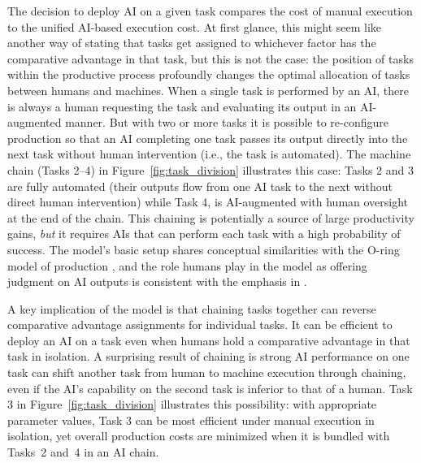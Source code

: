 \documentclass{article}
\theoremstyle{plain}
\theoremstyle{plain}
\begin{document}
The decision to deploy AI on a given task compares the cost of manual execution to the unified AI-based execution cost.  
At first glance, this might seem like another way of stating that tasks get assigned to whichever factor has the comparative advantage in that task, but this is not the case: the position of tasks within the productive process profoundly changes the optimal allocation of tasks between humans and machines.
When a single task is performed by an AI, there is always a human requesting the task and evaluating its output in an AI-augmented manner.  
But with two or more tasks it is possible to re-configure production so that an AI completing one task passes its output directly into the next task without human intervention (i.e., the task is automated).  
The machine chain (Tasks 2--4) in Figure~\ref{fig:task_division} illustrates this case: Tasks 2 and 3 are fully automated (their outputs flow from one AI task to the next without direct human intervention) while Task 4, is AI-augmented with human oversight at the end of the chain.
This chaining is potentially a source of large productivity gains, \emph{but} it requires AIs that can perform each task with a high probability of success.  
The model’s basic setup shares conceptual similarities with the O-ring model of production \citep{kremer1993}, and the role humans  play in the model as offering judgment on AI outputs is consistent with the emphasis in \cite{agrawal2019exploring}.

A key implication of the model is that chaining tasks together can reverse comparative advantage assignments for individual tasks.
It can be efficient to deploy an AI on a task even when humans hold a comparative advantage in that task in isolation.
A surprising result of chaining is strong AI performance on one task can shift another task from human to machine execution through chaining, even if the AI’s capability on the second task is inferior to that of a human.
Task 3 in Figure~\ref{fig:task_division} illustrates this possibility: with appropriate parameter values, Task 3 can be most efficient under manual execution in isolation, yet overall production costs are minimized when it is bundled with Tasks~2 and~4 in an AI chain.
\end{document}
